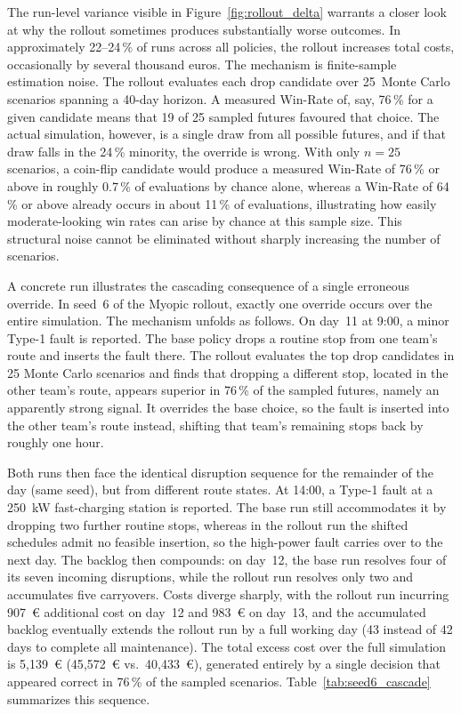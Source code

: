 \documentclass[12pt,oneside]{article}
\begin{document}
The run-level variance visible in Figure~\ref{fig:rollout_delta} warrants a closer look at why the rollout sometimes produces substantially worse outcomes. In approximately 22--24\,\% of runs across all policies, the rollout increases total costs, occasionally by several thousand euros. The mechanism is finite-sample estimation noise. The rollout evaluates each drop candidate over 25~Monte Carlo scenarios spanning a 40-day horizon. A measured Win-Rate of, say, 76\,\% for a given candidate means that 19 of 25 sampled futures favoured that choice. The actual simulation, however, is a single draw from all possible futures, and if that draw falls in the 24\,\% minority, the override is wrong. With only $n = 25$ scenarios, a coin-flip candidate would produce a measured Win-Rate of 76\,\% or above in roughly 0.7\,\% of evaluations by chance alone, whereas a Win-Rate of 64\,\% or above already occurs in about 11\,\% of evaluations, illustrating how easily moderate-looking win rates can arise by chance at this sample size. This structural noise cannot be eliminated without sharply increasing the number of scenarios.

A concrete run illustrates the cascading consequence of a single erroneous override. In seed~6 of the Myopic rollout, exactly one override occurs over the entire simulation. The mechanism unfolds as follows. On day~11 at 9:00, a minor Type-1 fault is reported. The base policy drops a routine stop from one team's route and inserts the fault there. The rollout evaluates the top drop candidates in 25 Monte Carlo scenarios and finds that dropping a different stop, located in the other team's route, appears superior in 76\,\% of the sampled futures, namely an apparently strong signal. It overrides the base choice, so the fault is inserted into the other team's route instead, shifting that team's remaining stops back by roughly one hour.

Both runs then face the identical disruption sequence for the remainder of the day (same seed), but from different route states. At 14:00, a Type-1 fault at a 250~kW fast-charging station is reported. The base run still accommodates it by dropping two further routine stops, whereas in the rollout run the shifted schedules admit no feasible insertion, so the high-power fault carries over to the next day. The backlog then compounds: on day~12, the base run resolves four of its seven incoming disruptions, while the rollout run resolves only two and accumulates five carryovers. Costs diverge sharply, with the rollout run incurring 907~€ additional cost on day~12 and 983~€ on day~13, and the accumulated backlog eventually extends the rollout run by a full working day (43 instead of 42 days to complete all maintenance). The total excess cost over the full simulation is 5{,}139~€ (45{,}572~€ vs.\ 40{,}433~€), generated entirely by a single decision that appeared correct in 76\,\% of the sampled scenarios. Table~\ref{tab:seed6_cascade} summarizes this sequence.
\end{document}
